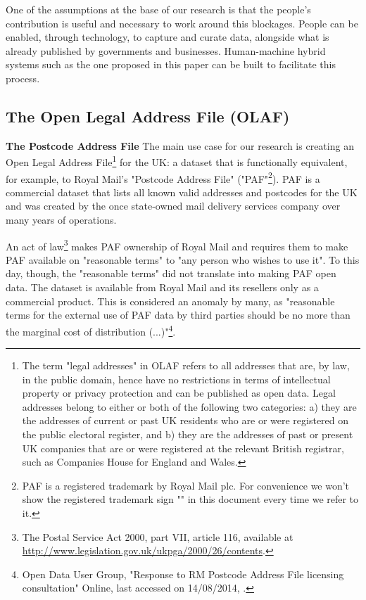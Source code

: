 One of the assumptions at the base of our research is that the people's contribution is useful and necessary to work around this blockages. People can be enabled, through technology, to capture and curate data, alongside what is already published by governments and businesses. Human-machine hybrid systems such as the one proposed in this paper can be built to facilitate this process.

\subsection{The Open Legal Address File (OLAF)}
\label{subs:the-problem-of-creating-an-olaf}

\textbf{The Postcode Address File} The main use case for our research is creating an Open Legal Address File\footnote{The term "legal addresses" in OLAF refers to all addresses that are, by law, in the public domain, hence have no restrictions in terms of intellectual property or privacy protection and can be published as open data. Legal addresses belong to either or both of the following two categories: a) they are the addresses of current or past UK residents who are or were registered on the public electoral register, and b) they are the addresses of past or present UK companies that are or were registered at the relevant British registrar, such as Companies House for England and Wales.} for the UK: a dataset that is functionally equivalent, for example, to Royal Mail's "Postcode Address File" ("PAF"\footnote{PAF is a registered trademark by Royal Mail plc. For convenience we won't show the registered trademark sign "\textregistered" in this document every time we refer to it.}). PAF is a commercial dataset that lists all known valid addresses and postcodes for the UK and was created by the once state-owned mail delivery services company over many years of operations.

An act of law\footnote{The Postal Service Act 2000, part VII, article 116, available at \url{http://www.legislation.gov.uk/ukpga/2000/26/contents}.} makes PAF ownership of Royal Mail and requires them to make PAF available on "reasonable terms" to "any person who wishes to use it". To this day, though, the "reasonable terms" did not translate into making PAF open data. The dataset is available from Royal Mail and its resellers only as a commercial product. This is considered an anomaly by many, as "reasonable terms for the external use of PAF data by third parties should be no more than the marginal cost of distribution (...)"\footnote{Open Data User Group, "Response to RM Postcode Address File licensing consultation" Online, last accessed on 14/08/2014, \odugurl.}.

